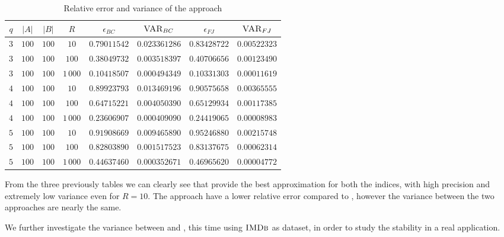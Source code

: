 \begin{table}[h]
	\centering
	\begin{tabular}{|c|c|c|c|c|c|c|c|}
		\hline
		$q$ & $|A|$ & $|B|$ & $R$      & $\epsilon_{BC}$ & $\textsc{VAR}_{BC}$ & $\epsilon_{FJ}$ & $\textsc{VAR}_{FJ}$ \\ \hline \hline
		$3$ & $100$ & $100$ & $10$     & $0.79011542$ & $0.023361286$ & $0.83428722$ & $0.00522323$ \\ \hline
		$3$ & $100$ & $100$ & $100$    & $0.38049732$ & $0.003518397$ & $0.40706656$ & $0.00123490$ \\ \hline
		$3$ & $100$ & $100$ & $1\,000$ & $0.10418507$ & $0.000494349$ & $0.10331303$ & $0.00011619$ \\ \hline \hline
		$4$ & $100$ & $100$ & $10$     & $0.89923793$ & $0.013469196$ & $0.90575658$ & $0.00365555$ \\ \hline
		$4$ & $100$ & $100$ & $100$    & $0.64715221$ & $0.004050390$ & $0.65129934$ & $0.00117385$ \\ \hline
		$4$ & $100$ & $100$ & $1\,000$ & $0.23606907$ & $0.000409090$ & $0.24419065$ & $0.00008983$ \\ \hline \hline
		$5$ & $100$ & $100$ & $10$     & $0.91908669$ & $0.009465890$ & $0.95246880$ & $0.00215748$ \\ \hline
		$5$ & $100$ & $100$ & $100$    & $0.82803890$ & $0.001517523$ & $0.83137675$ & $0.00062314$ \\ \hline
		$5$ & $100$ & $100$ & $1\,000$ & $0.44637460$ & $0.000352671$ & $0.46965620$ & $0.00004772$ \\ \hline
	\end{tabular}
	\caption{Relative error and variance of the \base approach}	
\end{table}
		
		\clearpage
		
		From the three previously tables we can clearly see that \fcount provide the best approximation for both the indices, 
		with high precision and extremely low variance even for $R=10$. 
		The \fsamp approach have a lower relative error compared to \base, however the variance between the two approaches are nearly the same.\medskip
		
		We further investigate the variance between \fsamp and \base, this time using $\textsc{IMDb}$ as dataset,
		in order to study the stability in a real application.
				
